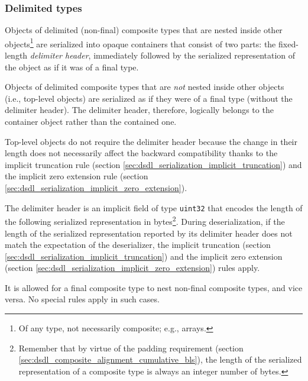 \subsubsection{Delimited types}\label{sec:dsdl_serialization_composite_non_final}

Objects of delimited (non-final) composite types that are nested inside other objects\footnote{%
    Of any type, not necessarily composite; e.g., arrays.
}
are serialized into opaque containers that consist of two parts:
the fixed-length \emph{delimiter header},
immediately followed by the serialized representation of the object as if it was of a final type.

Objects of delimited composite types that are \emph{not} nested inside other objects (i.e., top-level objects)
are serialized as if they were of a final type (without the delimiter header).
The delimiter header, therefore, logically belongs to the container object rather than the contained one.

\begin{remark}
    Top-level objects do not require the delimiter header because the change in their length does not necessarily
    affect the backward compatibility thanks to the implicit truncation rule
    (section \ref{sec:dsdl_serialization_implicit_truncation}) and the implicit zero extension rule
    (section \ref{sec:dsdl_serialization_implicit_zero_extension}).
\end{remark}

The delimiter header is an implicit field of type \verb|uint32| that encodes the length of the following
serialized representation in bytes\footnote{%
    Remember that by virtue of the padding requirement (section \ref{sec:dsdl_composite_alignment_cumulative_bls}),
    the length of the serialized representation of a composite type is always an integer number of bytes.
}.
During deserialization, if the length of the serialized representation reported by its delimiter header
does not match the expectation of the deserializer,
the implicit truncation (section \ref{sec:dsdl_serialization_implicit_truncation})
and the implicit zero extension (section \ref{sec:dsdl_serialization_implicit_zero_extension})
rules apply.

It is allowed for a final composite type to nest non-final composite types, and vice versa.
No special rules apply in such cases.

